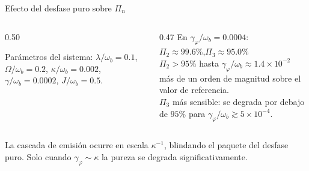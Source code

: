 \documentclass[
11pt,notheorems,hyperref={pdfauthor=whatever}
]{beamer}
\begin{document}
\begin{frame}{Efecto del desfase puro sobre $\Pi_n$}
	
	\begin{columns}[T]
		
		\begin{column}{0.50\textwidth}
			\vspace{-4pt}
			\begin{center}
				\resizebox{\textwidth}{!}{%
				}
			\end{center}
			{\scriptsize
				Parámetros del sistema: $\lambda/\omega_b=0.1$, $\Omega/\omega_b=0.2$,
				$\kappa/\omega_b=0.002$, $\gamma/\omega_b=0.0002$,
				$J/\omega_b=0.5$.
			}
		\end{column}
		
		\begin{column}{0.47\textwidth}
			\vspace{4pt}
			En $\gamma_\varphi/\omega_b = 0.0004$:\\[4pt]
			{\small
				$\Pi_2 \approx 99.6\%$,\quad $\Pi_3 \approx 95.0\%$\\[8pt]
				$\Pi_2 > 95\%$ hasta
				$\gamma_\varphi/\omega_b \approx 1.4\times10^{-2}$
				más de un orden de magnitud sobre el valor
				de referencia.\\[8pt]
				$\Pi_3$ más sensible: se degrada por debajo
				de $95\%$ para $\gamma_\varphi/\omega_b \gtrsim
				5\times10^{-4}$.
			}
		\end{column}
		
	\end{columns}
	
	\vspace{15pt}
	
	{\small
		La cascada de emisión ocurre en escala $\kappa^{-1}$,
		blindando el paquete del desfase puro. Solo cuando
		$\gamma_\varphi \sim \kappa$ la pureza se degrada
		significativamente.\\[6pt]
	}
	
\end{frame}
\end{document}
